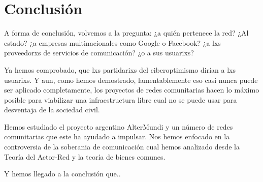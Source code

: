 \section{Conclusión}

A forma de conclusión, volvemos a la pregunta: ¿a quién pertenece la red?
¿Al estado? ¿a empresas multinacionales como Google o Facebook? ¿a lxs proveedorxs de servicios de comunicación? ¿o a sus usuarixs?

Ya hemos comprobado, que lxs partidarixs del ciberoptimismo dirían a lxs usuarixs.
Y aun, como hemos demostrado, lamentablemente eso casi nunca puede ser aplicado completamente, los proyectos de redes comunitarias hacen lo máximo posible para viabilizar una infraestructura libre cual no se puede usar para desventaja de la sociedad civil.

Hemos estudiado el proyecto argentino AlterMundi y un número de redes comunitarias que este ha ayudado a impulsar.
Nos hemos enfocado en la controversia de la soberania de comunicación cual hemos analizado desde la Teoría del Actor-Red y la teoría de bienes comunes.

Y hemos llegado a la conclusión que..


